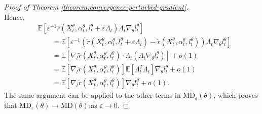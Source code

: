 \documentclass[11pt]{article}
\numberwithin{equation}{section}
\theoremstyle{definition}
\theoremstyle{remark}
\def\eps{\varepsilon}
\begin{document}
\begin{proof}[Proof of Theorem \ref{theorem:convergence-perturbed-gradient}]
\[\]
Hence,
\[
\begin{aligned}
    &\mathbb E \left[\eps^{-1} \tilde r(X_t^\theta, \alpha_t^\theta,l_t^\theta + \eps \Lambda_t) \Lambda_t \nabla_{\theta}l_t^\theta  \right] \\
    &\qquad= \mathbb E \left[\eps^{-1} (\tilde r(X_t^\theta, \alpha_t^\theta,l_t^\theta + \eps \Lambda_t) - \tilde r(X_t^\theta, \alpha_t^\theta, l_t^\theta)) \Lambda_t \nabla_{\theta}l_t^\theta   \right] \\
    &\qquad= \mathbb E\left[ \nabla_l \tilde r(X_t^\theta, \alpha_t^\theta, l_t^\theta) \cdot \Lambda_t \left(\Lambda_t \nabla_{\theta}l_t^\theta \right)\right] + o(1) \\
    &\qquad= \mathbb E[\nabla_l \tilde r(X_t^\theta, \alpha_t^\theta, l_t^\theta)] \mathbb E [\Lambda_t^T \Lambda_t] \nabla_{\theta} l_t^\theta + o (1) \\
    &\qquad= \mathbb E[\nabla_l \tilde r(X_t^\theta, \alpha_t^\theta, l_t^\theta)] \nabla_{\theta} l_t^\theta + o(1).
\end{aligned}
\]
The same argument can be applied to the other terms in $\mathrm{MD}_{\eps}(\theta)$, which proves that $\mathrm{MD}_{\eps}(\theta) \to \mathrm{MD}(\theta)$ as $\eps \to 0$.


\end{proof}
\end{document}

